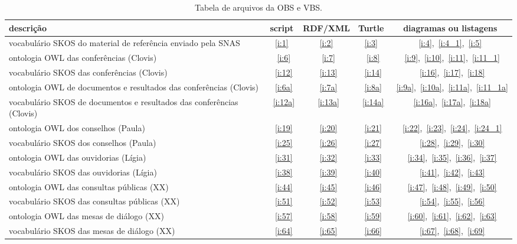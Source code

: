 \documentclass[12pt]{article}
\begin{document}
\begin{table}[htpq!]
\centering
\caption{Tabela de arquivos da OBS e VBS.}
\begin{tabular}{| p{6cm} | c | c | c | c | }\hline
 {\bf descrição} & {\bf script} & {\bf RDF/XML} & {\bf Turtle} & {\bf diagramas ou listagens} \\\hline\hline
vocabulário SKOS do material de referência enviado pela SNAS  & \ref{i:1} & \ref{i:2} & \ref{i:3} & \ref{i:4},~\ref{i:4_1},~\ref{i:5} \\\hline\hline
ontologia OWL das conferências (Clovis) &~\ref{i:6}&~\ref{i:7}&~\ref{i:8}&~\ref{i:9},~\ref{i:10},~\ref{i:11},~\ref{i:11_1} \\\hline
vocabulário SKOS das conferências (Clovis) &~\ref{i:12}&~\ref{i:13}&~\ref{i:14}&~\ref{i:16},~\ref{i:17},~\ref{i:18} \\\hline\hline

ontologia OWL  de documentos e resultados das conferências (Clovis) &~\ref{i:6a}&~\ref{i:7a}&~\ref{i:8a}&~\ref{i:9a},~\ref{i:10a},~\ref{i:11a},~\ref{i:11_1a} \\\hline
vocabulário SKOS de documentos e resultados das conferências (Clovis) &~\ref{i:12a}&~\ref{i:13a}&~\ref{i:14a}&~\ref{i:16a},~\ref{i:17a},~\ref{i:18a} \\\hline\hline

ontologia OWL dos conselhos (Paula) &~\ref{i:19}&~\ref{i:20}&~\ref{i:21}&~\ref{i:22},~\ref{i:23},~\ref{i:24},~\ref{i:24_1} \\\hline
vocabulário SKOS dos conselhos (Paula) &~\ref{i:25}&~\ref{i:26}&~\ref{i:27}&~\ref{i:28},~\ref{i:29},~\ref{i:30} \\\hline\hline

ontologia   OWL das  ouvidorias (Lígia) &~\ref{i:31}&~\ref{i:32}&~\ref{i:33}&~\ref{i:34},~\ref{i:35},~\ref{i:36},~\ref{i:37} \\\hline
vocabulário SKOS das ouvidorias (Lígia) &~\ref{i:38}&~\ref{i:39}&~\ref{i:40}&~\ref{i:41},~\ref{i:42},~\ref{i:43} \\\hline\hline

ontologia   OWL  das consultas públicas (XX) &~\ref{i:44}&~\ref{i:45}&~\ref{i:46}&~\ref{i:47},~\ref{i:48},~\ref{i:49},~\ref{i:50} \\\hline
vocabulário SKOS das consultas públicas (XX) &~\ref{i:51}&~\ref{i:52}&~\ref{i:53}&~\ref{i:54},~\ref{i:55},~\ref{i:56} \\\hline\hline

ontologia   OWL  das mesas de diálogo (XX) &~\ref{i:57}&~\ref{i:58}&~\ref{i:59}&~\ref{i:60},~\ref{i:61},~\ref{i:62},~\ref{i:63} \\\hline
vocabulário SKOS das mesas de diálogo (XX) &~\ref{i:64}&~\ref{i:65}&~\ref{i:66}&~\ref{i:67},~\ref{i:68},~\ref{i:69} \\\hline\hline


\end{tabular}
\end{table}
\end{document}
